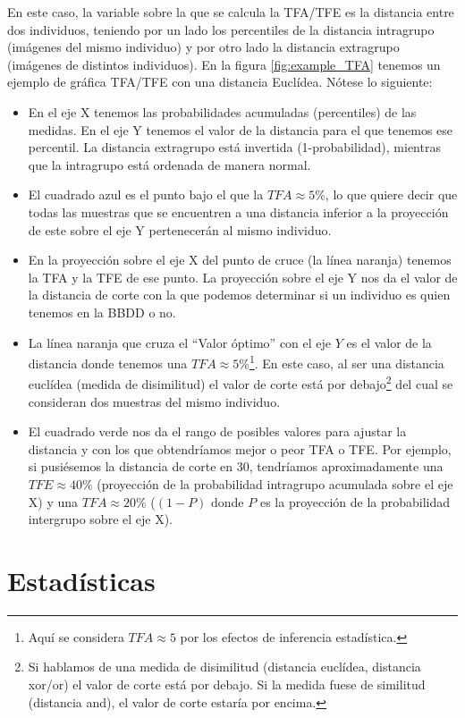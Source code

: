 En este caso, la variable sobre la que se calcula la TFA/TFE es la distancia entre dos individuos, teniendo por un lado los percentiles de la distancia intragrupo (imágenes del mismo individuo) y por otro lado la distancia extragrupo (imágenes de distintos individuos). En la figura \ref{fig:example_TFA} tenemos un ejemplo de gráfica TFA/TFE con una distancia Euclídea. Nótese lo siguiente:
\begin{itemize}
	\item{En el eje X tenemos las probabilidades acumuladas (percentiles) de las medidas. En el eje Y tenemos el valor de la distancia para el que tenemos ese percentil. La distancia extragrupo está invertida (1-probabilidad), mientras que la intragrupo está ordenada de manera normal.}
	\item{El cuadrado azul es el punto bajo el que la $TFA\approx5\%$, lo que quiere decir que todas las muestras que se encuentren a una distancia inferior a la proyección de este sobre el eje Y pertenecerán al mismo individuo.}
	\item{En la proyección sobre el eje X del punto de cruce (la línea naranja) tenemos la TFA y la TFE de ese punto. La proyección sobre el eje Y nos da el valor de la distancia de corte con la que podemos determinar si un individuo es quien tenemos en la BBDD o no.}
	\item{La línea naranja que cruza el ``Valor óptimo'' con el eje $Y$ es el valor de la distancia donde tenemos una $TFA\approx5\%$\footnote{Aquí se considera $TFA\approx5$ por los efectos de inferencia estadística.}. En este caso, al ser una distancia euclídea (medida de disimilitud) el valor de corte está por debajo\footnote{Si hablamos de una medida de disimilitud (distancia euclídea, distancia xor/or) el valor de corte está por debajo. Si la medida fuese de similitud (distancia and), el valor de corte estaría por encima.} del cual se consideran dos muestras del mismo individuo. }
	\item{El cuadrado verde nos da el rango de posibles valores para ajustar la distancia y con los que obtendríamos mejor o peor TFA o TFE. Por ejemplo, si pusiésemos la distancia de corte en 30, tendríamos aproximadamente una $TFE\approx40\%$ (proyección de la probabilidad intragrupo acumulada sobre el eje X) y una $TFA\approx20\%$ ($(1-P)$ donde $P$ es la proyección de la probabilidad intergrupo sobre el eje X).} 
\end{itemize}

\section{Estadísticas}

